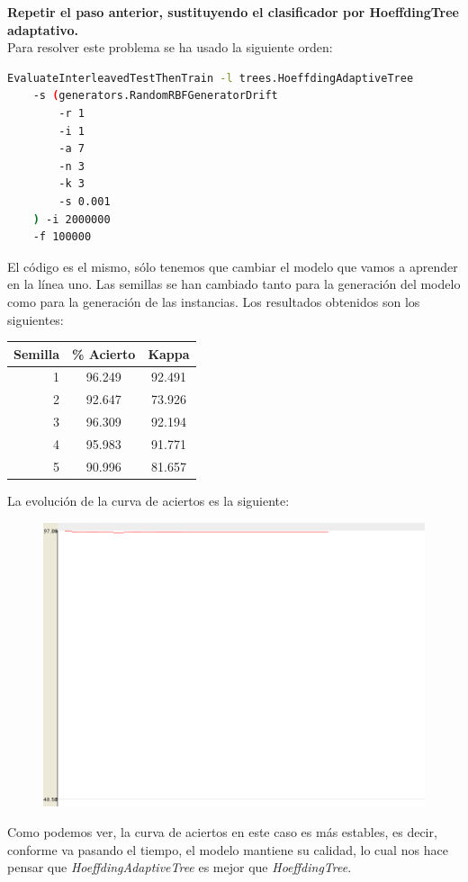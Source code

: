 \documentclass[11pt]{article}
\begin{document}
\textbf{Repetir el paso anterior, sustituyendo el clasificador por HoeffdingTree adaptativo.} \\

Para resolver este problema se ha usado la siguiente orden:

\begin{lstlisting}[language=bash]
EvaluateInterleavedTestThenTrain -l trees.HoeffdingAdaptiveTree
	-s (generators.RandomRBFGeneratorDrift 
		-r 1 
		-i 1 
		-a 7 
		-n 3
		-k 3 
		-s 0.001 
	) -i 2000000
	-f 100000
\end{lstlisting}

El código es el mismo, sólo tenemos que cambiar el modelo que vamos a aprender en la línea uno. Las semillas se han cambiado tanto para la generación del modelo como para la generación de las instancias. Los resultados obtenidos son los siguientes:

\begin{table}[H]
	\centering
	\begin{tabular}{rcc}
		\textbf{Semilla} & \textbf{\% Acierto} & \textbf{Kappa} \\ \hline
		1 & 96.249 & 92.491 \\
		2 & 92.647 & 73.926 \\
		3 & 96.309 & 92.194 \\
		4 & 95.983 & 91.771 \\
		5 & 90.996 & 81.657
	\end{tabular}
\end{table}

La evolución de la curva de aciertos es la siguiente:

\begin{figure}[H]
	\centering
	\includegraphics[width=0.5\linewidth]{2_3_2.png}
\end{figure}

Como podemos ver, la curva de aciertos en este caso es más estables, es decir, conforme va pasando el tiempo, el modelo mantiene su calidad, lo cual nos hace pensar que \textit{HoeffdingAdaptiveTree} es mejor que \textit{HoeffdingTree}.
\end{document}
